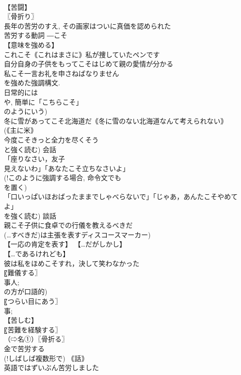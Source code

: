 \documentclass[8pt]{extreport}
\begin{document}
\begin{CJK}{UTF8}{min}
\\	【苦闘】
\\	〖骨折り〗
\\	長年の苦労のすえ, その画家はついに真価を認められた 
\\	苦労する動詞 ―こそ 
\\	【意味を強める】 
\\	これこそ｟これはまさに｠私が捜していたペンです 
\\	自分自身の子供をもってこそはじめて親の愛情が分かる 
\\	私こそ一言お礼を申さねばなりません 
\\	を強めた強調構文. 
\\	日常的には 
\\	や, 簡単に「こちらこそ」
\\	のようにいう) 
\\	冬に雪があってこそ北海道だ｟冬に雪のない北海道なんて考えられない｠ 
\\	(｟主に米｠ 
\\	今度こそきっと全力を尽くそう 
\\	と強く読む) 会話 
\\	「座りなさい，友子
\\	見えないわ」「あなたこそ立ちなさいよ」 
\\	(!このように強調する場合, 命令文でも 
\\	を置く) 
\\	「口いっぱいほおばったままでしゃべらないで」「じゃあ，あんたこそやめてよ」 
\\	を強く読む) 談話 
\\	親こそ子供に食卓での行儀を教えるべきだ 
\\	(…すべきだ)は主張を表すディスコースマーカー) 
\\	【一応の肯定を表す】 【…だがしかし】
\\	【…であるけれども】
\\	彼は私をほめこそすれ，決して笑わなかった 
\\	〖難儀する〗
\\	事人; 
\\	の方が口語的) 
\\	〖つらい目にあう〗
\\	事; 
\\	【苦しむ】
\\	〖苦難を経験する〗
\\	（⇨名①）〖骨折る〗
\\	金で苦労する 
\\	(!しばしば複数形で) ｟話｠
\\	英語ではずいぶん苦労しました 

\end{CJK}
\end{document}
